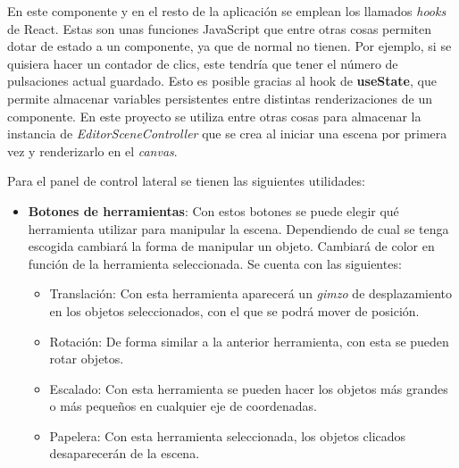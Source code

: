 En este componente y en el resto de la aplicación se emplean los llamados \textit{hooks} de React. Estas son unas funciones JavaScript que entre otras cosas permiten dotar de estado a un componente, ya que de normal no tienen. Por ejemplo, si se quisiera hacer un contador de clics, este tendría que tener el número de pulsaciones actual guardado. Esto es posible gracias al hook de \textbf{useState}, que permite almacenar variables persistentes entre distintas renderizaciones de un componente. En este proyecto se utiliza entre otras cosas para almacenar la instancia de \textit{EditorSceneController} que se crea al iniciar una escena por primera vez y renderizarlo en el \textit{canvas}.

Para el panel de control lateral se tienen las siguientes utilidades:

\begin{itemize}
    \item \textbf{Botones de herramientas}: Con estos botones se puede elegir qué herramienta utilizar para manipular la escena. Dependiendo de cual se tenga escogida cambiará la forma de manipular un objeto. Cambiará de color en función de la herramienta seleccionada. Se cuenta con las siguientes:
        \begin{itemize}
            \item Translación: Con esta herramienta aparecerá un \textit{gimzo} de desplazamiento en los objetos seleccionados, con el que se podrá mover de posición.
            \item Rotación: De forma similar a la anterior herramienta, con esta se pueden rotar objetos.
            \item Escalado: Con esta herramienta se pueden hacer los objetos más grandes o más pequeños en cualquier eje de coordenadas.
            \item Papelera: Con esta herramienta seleccionada, los objetos clicados desaparecerán de la escena.
        \end{itemize}


\end{itemize}
